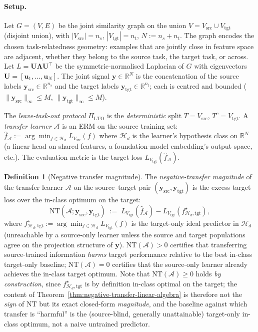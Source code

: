 \documentclass[11pt,a4paper]{article}
\theoremstyle{plain}
\theoremstyle{definition}
\newtheorem{definition}[theorem]{Definition}
\theoremstyle{remark}
\newcommand{\by}{\mathbf{y}}
\newcommand{\bU}{\mathbf{U}}
\newcommand{\bu}{\mathbf{u}}
\newcommand{\R}{\mathbb{R}}
\newcommand{\Acal}{\mathcal{A}}
\newcommand{\Hcal}{\mathcal{H}}
\begin{document}
\paragraph{Setup.}  Let $G = (V, E)$ be the joint similarity graph on
the union $V = V_{\mathrm{src}} \cup V_{\mathrm{tgt}}$ (disjoint
union), with $|V_{\mathrm{src}}| = n_s$, $|V_{\mathrm{tgt}}| = n_t$,
$N := n_s + n_t$.  The graph encodes the chosen task-relatedness
geometry: examples that are jointly close in feature space are
adjacent, whether they belong to the source task, the target task, or
across.  Let $L = \bU \boldsymbol{\Lambda} \bU^\top$ be the
symmetric-normalised Laplacian of $G$ with eigenvectors $\bU = [\bu_1,
\ldots, \bu_N]$.  The joint signal $\by \in \R^N$ is the concatenation
of the source labels $\by_{\mathrm{src}} \in \R^{n_s}$ and the target
labels $\by_{\mathrm{tgt}} \in \R^{n_t}$; each is centred and bounded
($\|\by_{\mathrm{src}}\|_\infty \leq M$,
$\|\by_{\mathrm{tgt}}\|_\infty \leq M$).

The \emph{leave-task-out protocol} $\Pi_{\mathrm{LTO}}$ is the
\emph{deterministic} split $T = V_{\mathrm{src}}$, $T^c =
V_{\mathrm{tgt}}$.  A \emph{transfer learner} $\Acal$ is an ERM on the
source training set: $\hat f_\Acal := \arg\min_{f \in \Hcal_d}
L_{V_{\mathrm{src}}}(f)$ where $\Hcal_d$ is the learner's hypothesis
class on $\R^N$ (a linear head on shared features, a foundation-model
embedding's output space, etc.).  The evaluation metric is the
target loss $L_{V_{\mathrm{tgt}}}(\hat f_\Acal)$.

\begin{definition}[Negative transfer magnitude]
\label{def:nt-magnitude}
The \emph{negative-transfer magnitude} of the transfer learner $\Acal$
on the source--target pair $(\by_{\mathrm{src}}, \by_{\mathrm{tgt}})$
is the excess target loss over the in-class optimum on the target:
\begin{equation}
    \mathrm{NT}(\Acal; \by_{\mathrm{src}}, \by_{\mathrm{tgt}})
    \;:=\; L_{V_{\mathrm{tgt}}}(\hat f_\Acal) - L_{V_{\mathrm{tgt}}}(f^\star_{\Hcal_d, \mathrm{tgt}}),
    \label{eq:nt-magnitude}
\end{equation}
where $f^\star_{\Hcal_d, \mathrm{tgt}} := \arg\min_{f \in \Hcal_d}
L_{V_{\mathrm{tgt}}}(f)$ is the target-only ideal predictor in $\Hcal_d$
(unreachable by a source-only learner unless the source and target
populations agree on the projection structure of $\by$).
$\mathrm{NT}(\Acal) > 0$ certifies that transferring source-trained
information \emph{harms} target performance relative to the best
in-class target-only baseline; $\mathrm{NT}(\Acal) = 0$ certifies that
the source-only learner already achieves the in-class target optimum.
Note that $\mathrm{NT}(\Acal) \ge 0$ holds \emph{by construction},
since $f^\star_{\Hcal_d, \mathrm{tgt}}$ is by definition in-class
optimal on the target; the content of
Theorem~\ref{thm:negative-transfer-linear-algebra} is therefore not
the \emph{sign} of $\mathrm{NT}$ but its exact closed-form
\emph{magnitude}, and the baseline against which transfer is
``harmful'' is the (source-blind, generally unattainable) target-only
in-class optimum, not a naive untrained predictor.
\end{definition}
\end{document}

